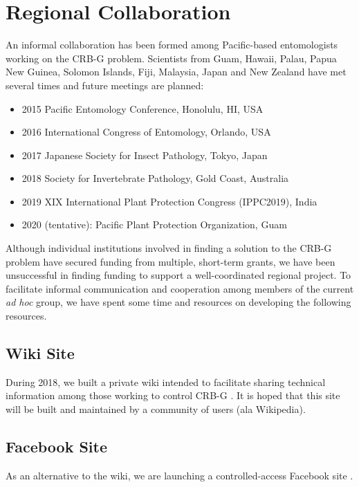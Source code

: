 \documentclass[12pt,letterpaper,english,bibliography=totocnumbered]{scrartcl}
\begin{document}
\newpage
\section{Regional Collaboration}

An informal collaboration has been formed among Pacific-based entomologists working on the CRB-G problem. Scientists from Guam, Hawaii, Palau, Papua New Guinea, Solomon Islands, Fiji, Malaysia, Japan and New Zealand have met several times and future meetings are planned:
\begin{itemize}
	\item 2015 Pacific Entomology Conference, Honolulu, HI, USA
	\item 2016 International Congress of Entomology, Orlando, USA
	\item 2017 Japanese Society for Insect Pathology, Tokyo, Japan
	\item 2018 Society for Invertebrate Pathology, Gold Coast, Australia
	\item 2019 XIX International Plant Protection Congress (IPPC2019), India
	\item 2020 (tentative): Pacific Plant Protection Organization, Guam	
\end{itemize}

Although individual institutions involved in finding a solution to the CRB-G problem
have secured funding from multiple, short-term grants, we have been unsuccessful in
finding funding to support a well-coordinated regional project. To facilitate informal
communication and cooperation among members of the current \textit{ad hoc} group, we have
spent some time and resources on developing the following resources.

\subsection{Wiki Site}

During 2018, we built a private wiki intended to facilitate sharing technical information among those working to control CRB-G \cite{moore_crb-g_2019}. It is hoped that this site will be built and maintained by a community of users (ala Wikipedia).

\subsection{Facebook Site}

As an alternative to the wiki, we are launching a controlled-access Facebook site \cite{moore_facebook_2019}.
\end{document}
